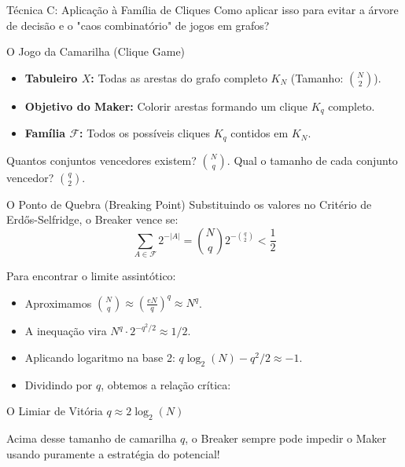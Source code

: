 \documentclass[11pt, aspectratio=169]{beamer}
\begin{document}
\begin{frame}{Técnica C: Aplicação à Família de Cliques}
    Como aplicar isso para evitar a árvore de decisão e o "caos combinatório" de jogos em grafos?
    
    \begin{block}{O Jogo da Camarilha (Clique Game)}
        \begin{itemize}
            \item \textbf{Tabuleiro $X$:} Todas as arestas do grafo completo $K_N$ (Tamanho: $\binom{N}{2}$).
            \item \textbf{Objetivo do Maker:} Colorir arestas formando um clique $K_q$ completo.
            \item \textbf{Família $\mathcal{F}$:} Todos os possíveis cliques $K_q$ contidos em $K_N$.
        \end{itemize}
    \end{block}
    
    Quantos conjuntos vencedores existem? $\binom{N}{q}$.
    Qual o tamanho de cada conjunto vencedor? $\binom{q}{2}$.
\end{frame}

\begin{frame}{O Ponto de Quebra (Breaking Point)}
    Substituindo os valores no Critério de Erdős-Selfridge, o Breaker vence se:
    \begin{equation*}
        \sum_{A \in \mathcal{F}} 2^{-|A|} = \binom{N}{q} 2^{-\binom{q}{2}} < \frac{1}{2}
    \end{equation*}
    
    Para encontrar o limite assintótico:
    \begin{itemize}
        \item Aproximamos $\binom{N}{q} \approx \left(\frac{eN}{q}\right)^q \approx N^q$.
        \item A inequação vira $N^q \cdot 2^{-q^2/2} \approx 1/2$.
        \item Aplicando logaritmo na base 2: $q \log_2(N) - q^2/2 \approx -1$.
        \item Dividindo por $q$, obtemos a relação crítica:
    \end{itemize}
    \begin{alertblock}{O Limiar de Vitória}
        $q \approx 2 \log_2(N)$
    \end{alertblock}
    Acima desse tamanho de camarilha $q$, o Breaker sempre pode impedir o Maker usando puramente a estratégia do potencial!
\end{frame}
\end{document}

